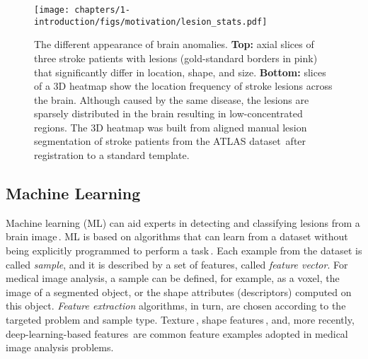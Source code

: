 \begin{figure}[!ht]
    \centering
    \texttt{[image: chapters/1-introduction/figs/motivation/lesion\_stats.pdf]}
    
    \caption[The different appearance of brain anomalies.]{
        The different appearance of brain anomalies. \textbf{Top:} axial slices of three stroke patients with lesions (gold-standard borders in pink) that significantly differ in location, shape, and size. \textbf{Bottom:} slices of a 3D heatmap show the location frequency of stroke lesions across the brain. Although caused by the same disease, the lesions are sparsely distributed in the brain resulting in low-concentrated regions. The 3D heatmap was built from aligned manual lesion segmentation of stroke patients from the ATLAS dataset\,\cite{Liew-2018-Nature-ATLAS-304} after registration to a standard template. 
        }
    \label{fig:lesion_analysis_difficulties}
\end{figure}


\subsection{Machine Learning}
\label{subsec:machine_learning}

Machine learning (ML) can aid experts in detecting and classifying lesions from a brain image\,\cite{Havaei:2017:BrainTumourSegWithDL}. ML is based on algorithms that can learn from a dataset without being explicitly programmed to perform a task\,\cite{Jansen-2019-PhDThesis}. Each example from the dataset is called \emph{sample}, and it is described by a set of features, called \emph{feature vector}. For medical image analysis, a sample can be defined, for example, as a voxel, the image of a segmented object, or the shape attributes (descriptors) computed on this object. \emph{Feature extraction} algorithms, in turn, are chosen according to the targeted problem and sample type. Texture\,\cite{Soltaninejad-2017-AutomatedBrainSuperpixel,Goetz-2014-ExtremelyRandomized,Geremia-2011-NEURO-MSLesion,Pinto-2015-EMBC-BrainTumourSeg,Martins-2019-ISBI-SAAD}, shape features\,\cite{Martins-2019-MedPhysics-AdaPro,Lotjonen-2010-NEURO-MALF,Zacharaki-2009-Classification}, and, more recently, deep-learning-based features\,\cite{Havaei:2017:BrainTumourSegWithDL,Litjens-2017-MEDIA-SurveyDLInMIA,Vasilakos-2016-NNForCAD,Aslani-2018-DeepAE-MICCAI} are common feature examples adopted in medical image analysis problems.


